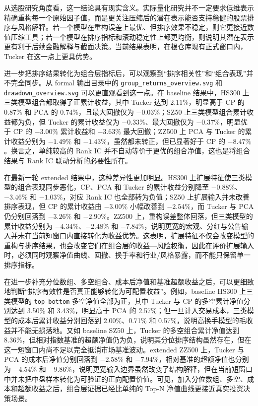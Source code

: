 从选股研究角度看，这一结论具有现实含义。实际量化研究并不一定要求低维表示精确重构每一个原始因子值，而是更关注压缩后的潜在表示能否支持稳健的股票排序与风格解释。若一个模型在重构误差上最优、但排序效果不稳定，则它更接近数值压缩工具；若一个模型在排序指标和滚动稳定性上都更均衡，则说明其潜在表示更有利于后续金融解释与截面决策。当前结果表明，在根仓库现有正式窗口内，Tucker 在这一点上更具优势。

进一步把排序结果转化为组合层指标后，可以观察到“排序相关性”和“组合表现”并不完全同步。从 formal 输出目录中的 \texttt{group\_returns\_overview.svg} 和 \texttt{drawdown\_overview.svg} 可以更直观看到这一点。在 baseline 结果中，HS300 上三类模型组合都取得了正累计收益，其中 Tucker 达到 2.11\%，明显高于 CP 的 0.87\% 和 PCA 的 0.74\%，且最大回撤仅为 $-0.03\%$；SZ50 上三类模型组合累计收益都为负，但 Tucker 的累计收益仅为 $-0.33\%$、最大回撤仅为 $-0.37\%$，明显优于 CP 的 $-3.00\%$ 累计收益和 $-3.63\%$ 最大回撤；ZZ500 上 PCA 与 Tucker 的累计收益分别为 $-1.49\%$ 和 $-1.43\%$，虽然都未转正，但已显著好于 CP 的 $-8.47\%$。换言之，单纯较高的 Rank IC 并不自动等价于更优的组合净值，这也是将组合结果与 Rank IC 联动分析的必要性所在。

在最新一轮 extended 结果中，这种差异性更加明显。HS300 上扩展特征使三类模型的组合表现同步恶化，CP、PCA 和 Tucker 的累计收益分别降至 $-0.88\%$、$-3.46\%$ 和 $-1.03\%$，对应 Rank IC 也全部转为负值；SZ50 上扩展输入并未改善排序表现，但 CP 的累计收益由 $-3.00\%$ 小幅改善到 $-2.54\%$，而 Tucker 与 PCA 仍分别回落到 $-3.26\%$ 和 $-2.90\%$。ZZ500 上，重构误差整体回落，但三类模型的累计收益分别为 $-4.34\%$、$-2.48\%$ 和 $-7.84\%$，说明更宽的宏观、分红与公告输入并未在当前短窗口内直接转化为收益优势。这表明，扩展特征不仅会改变模型的重构与排序结果，也会改变它们在组合层的收益—风险权衡，因此在评价扩展输入时，必须同时观察净值曲线、回撤、换手率和行业/风格暴露，而不能只保留单一排序指标。

在进一步补充分位数组、多空组合、成本后净值和基准超额收益之后，可以更细致地判断“排序有效性是否真正能够转化为可配置收益”。例如，baseline HS300 上三类模型的 \texttt{top-bottom} 多空净值全部为正，其中 Tucker 与 CP 的多空累计净值分别达到 3.50\% 和 3.43\%，明显高于 PCA 的 2.57\%；但一旦计入交易成本，三类模型的成本后累计收益分别回落到 2.00\%、0.71\% 和 0.57\%，说明高换手模型的毛收益并不能无损落地。又如 baseline SZ50 上，Tucker 的多空组合累计净值达到 8.36\%，但相对指数基准的超额净值仍为负，说明其分位排序结构虽然存在，但在这一短窗口内尚不足以完全抵消市场基准波动。extended ZZ500 上，Tucker 与 PCA 的成本后净值分别回落到 $-2.58\%$ 和 $-7.94\%$，相对基准的超额净值也分别为 $-4.54\%$ 和 $-9.86\%$，说明更宽输入边界虽然改变了结构解释，但在当前短窗口中并未把中盘样本转化为可验证的正向配置价值。可见，加入分位数组、多空、成本和超额收益之后，组合层证据已经比单纯的 Top-N 净值曲线更接近真实投资决策场景。

